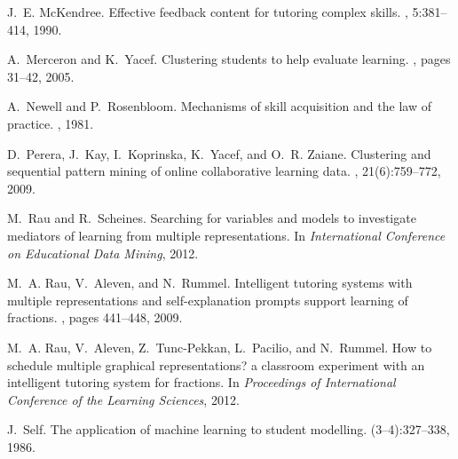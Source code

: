 \documentclass{edm_template}
\begin{document}
\begin{thebibliography}{10}
J.~E. McKendree.
\newblock Effective feedback content for tutoring complex skills.
, 5:381--414, 1990.

A.~Merceron and K.~Yacef.
\newblock Clustering students to help evaluate learning.
, pages 31--42, 2005.

A.~Newell and P.~Rosenbloom.
\newblock Mechanisms of skill acquisition and the law of practice.
, 1981.

D.~Perera, J.~Kay, I.~Koprinska, K.~Yacef, and O.~R. Zaiane.
\newblock Clustering and sequential pattern mining of online collaborative
  learning data.
,
  21(6):759--772, 2009.

M.~Rau and R.~Scheines.
\newblock Searching for variables and models to investigate mediators of
  learning from multiple representations.
\newblock In {\em International Conference on Educational Data Mining}, 2012.

M.~A. Rau, V.~Aleven, and N.~Rummel.
\newblock Intelligent tutoring systems with multiple representations and
  self-explanation prompts support learning of fractions.
, pages 441--448, 2009.

M.~A. Rau, V.~Aleven, Z.~Tunc-Pekkan, L.~Pacilio, and N.~Rummel.
\newblock How to schedule multiple graphical representations? a classroom
  experiment with an intelligent tutoring system for fractions.
\newblock In {\em Proceedings of International Conference of the Learning
  Sciences}, 2012.

J.~Self.
\newblock The application of machine learning to student modelling.
(3--4):327--338, 1986.

\end{thebibliography}

\balancecolumns
\end{document}
